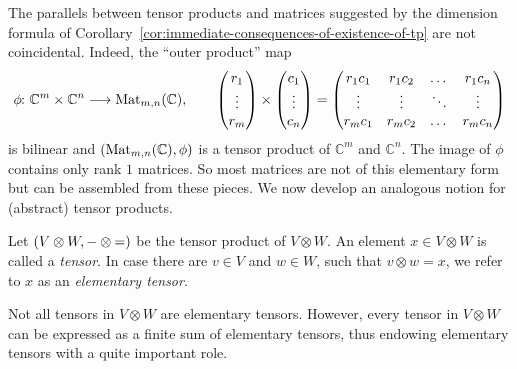 \documentclass[a4paper, oneside, 12pt]{amsart}
\begin{document}
The parallels between tensor products and matrices suggested by the dimension formula of Corollary~\ref{cor:immediate-consequences-of-existence-of-tp} are not coincidental.
Indeed, the ``outer product'' map
\begin{equation*}
  \phi \from \mathbb{C}^m \times \mathbb{C}^n \to \Mat_{m,n}(\mathbb{C}), \qquad
  \begin{pmatrix} r_1 \\ \vdots \\ r_m \end{pmatrix} \times
  \begin{pmatrix} c_1 \\ \vdots \\ c_n \end{pmatrix} =
  \begin{pmatrix}
    r_1 c_1 & r_1 c_2 & \dots & r_1 c_n \\
    \vdots & \vdots & \ddots & \vdots \\
    r_m c_1 & r_m c_2 & \dots & r_m c_n
  \end{pmatrix}
\end{equation*}
is bilinear  and \( (\operatorname{Mat}_{m,n}(\mathbb{C}), \phi) \) is a tensor product of \( \mathbb{C}^m \) and \( \mathbb{C}^n \).
The image of \(\phi\) contains only rank \(1\) matrices.
So most matrices are not of this elementary form but can be assembled from these pieces.
We now develop an analogous notion for (abstract) tensor products.

\begin{definition}\label{def:elementary-tensors}
  Let \((V \otimes W, {-} \otimes {=})\) be the tensor product of \(V \otimes W\).
  An element \(x\in V\otimes W\) is called a \emph{tensor}.
  In case there are \(v\in V\) and \(w\in W\), such that \(v\otimes w = x\), we refer to \(x\) as an \emph{elementary tensor}.
\end{definition}

Not all tensors in \( V \otimes W \) are elementary tensors.
However, every tensor in \( V \otimes W \) can be expressed as a finite sum of elementary tensors, thus endowing elementary tensors with a quite important role.
\end{document}
